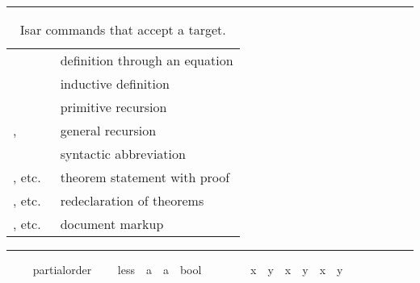 \begin{isabellebody}
\begin{isamarkuptext}
\begin{table}
\hrule
\vspace{2ex}
\begin{center}
\begin{tabular}{ll}
  \isakeyword{definition} & definition through an equation \\
  \isakeyword{inductive} & inductive definition \\
  \isakeyword{primrec} & primitive recursion \\
  \isakeyword{fun}, \isakeyword{function} & general recursion \\
  \isakeyword{abbreviation} & syntactic abbreviation \\
  \isakeyword{theorem}, etc.\ & theorem statement with proof \\
  \isakeyword{theorems}, etc.\ & redeclaration of theorems \\
  \isakeyword{text}, etc.\ & document markup
\end{tabular}
\end{center}
\hrule
\caption{Isar commands that accept a target.}
\label{tab:commands-with-target}
\end{table}%
\end{isamarkuptext}%
\isamarkuptrue%
\ \ \isamarkupfalse%
\ {}\ partial{}order{}\isanewline
\ \ \ \ less\ {}{}\ {}{}a\ {}\ {}a\ {}\ bool{}\ {}\ {}{}{}\ {}{}{}\isanewline
\ \ \ \ \ {}{}x\ {}\ y{}\ {}\ {}x\ {}\ y\ {}\ x\ {}\ y{}{}%

\end{isabellebody}
